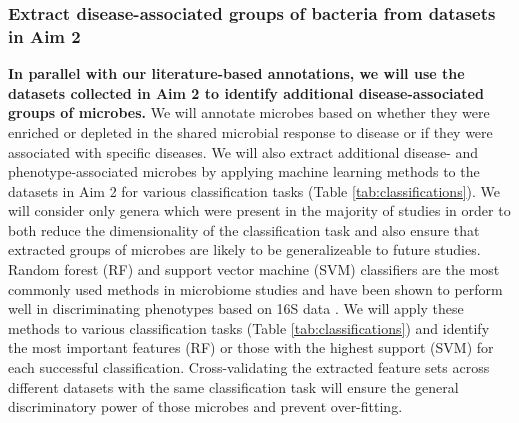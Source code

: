 \documentclass[12pt]{article}
\begin{document}
\subsubsection{Extract disease-associated groups of bacteria from datasets in Aim 2}
\textbf{In parallel with our literature-based annotations, 
we will use the datasets collected in Aim 2 to identify
additional disease-associated groups of microbes.} We will annotate microbes 
based on whether they were enriched or depleted in the shared microbial response to disease or if they were associated with specific diseases. 
We will also extract additional disease- and phenotype-associated microbes by 
applying machine learning methods to the datasets in Aim 2 for
various classification tasks (Table \ref{tab:classifications}). 
We will consider only genera which were present in the majority of studies 
in order to both reduce the dimensionality of the classification 
task and also ensure that extracted groups of microbes
are likely to be generalizeable to future studies. Random forest (RF) and support
vector machine (SVM) classifiers are the most commonly used methods in
microbiome studies and have been shown to perform well in discriminating
phenotypes based on 16S data \cite{ibd-papa, knights-supervised-2010, pasolli-meta_analysis-2016}. 
We will apply these methods to various classification tasks (Table \ref{tab:classifications})
and identify the most important features (RF) or those with the highest support (SVM)
for each successful classification.
Cross-validating the extracted feature sets across different datasets with the same
classification task will ensure the general discriminatory 
power of those microbes and prevent over-fitting.
\end{document}
